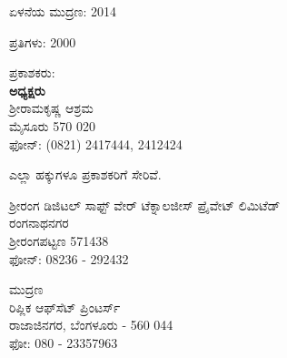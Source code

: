 \thispagestyle{empty}

\begin{flushleft}
ಏಳನೆಯ ಮುದ್ರಣ: 2014
\end{flushleft}

\vfill

\begin{flushleft}
ಪ್ರತಿಗಳು: 2000
\end{flushleft}

\vfill

\begin{flushleft}
ಪ್ರಕಾಶಕರು:\\\textbf{ಅಧ್ಯಕ್ಷರು}\\ಶ‍್ರೀರಾಮಕೃಷ್ಣ ಆಶ್ರಮ\\ ಮೈಸೂರು 570 020\\ಫೋನ್​: (0821) 2417444, 2412424
\end{flushleft}

\vfill

\begin{flushleft}
 ಎಲ್ಲಾ ಹಕ್ಕುಗಳೂ ಪ್ರಕಾಶಕರಿಗೆ ಸೇರಿವೆ.
\end{flushleft}

\vfill

\begin{flushleft}
ಶ‍್ರೀರಂಗ ಡಿಜಿಟಲ್ ಸಾಫ್ಟ್ ‍ವೇರ್ ಟೆಕ್ನಾಲಜೀಸ್ ಪ್ರೈವೇಟ್ ಲಿಮಿಟೆಡ್\\ರಂಗನಾಥನಗರ\\ಶ‍್ರೀರಂಗಪಟ್ಟಣ 571438\\ಫೋನ್​: 08236 - 292432
\end{flushleft}

\vfill

\begin{flushleft}
ಮುದ್ರಣ\\ರಿಪ್ಲಿಕ ಆಫ್‌ಸೆಟ್ ಪ್ರಿಂಟರ್ಸ್\\ರಾಜಾಜಿನಗರ, ಬೆಂಗಳೂರು - 560 044\\ಫೋ: 080 - 23357963
\end{flushleft}

